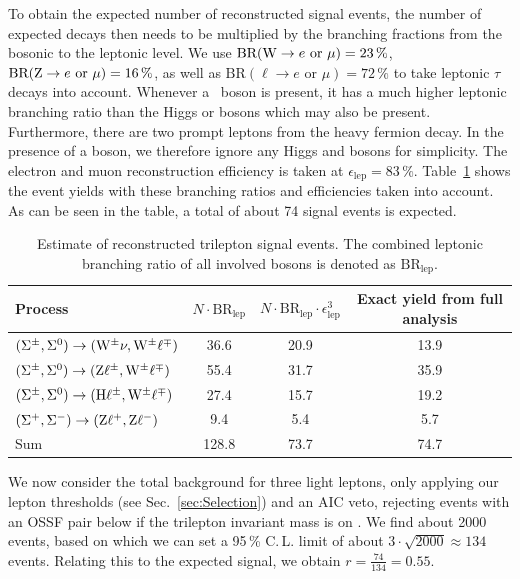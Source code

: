 To obtain the expected number of reconstructed signal events, the number of expected decays then needs to be multiplied by the branching fractions from the bosonic to the leptonic level. We use $\textrm{BR}(\mathrm{W} \to e \text{ or } \mu) = 23\,\%$, $\textrm{BR}(\mathrm{Z} \to e \text{ or } \mu) = 16\,\%$, as well as $\textrm{BR}(\ell\to e \text{ or } \mu) = 72\,\%$ to take leptonic $\tau$ decays into account. Whenever a \PW\ boson is present, it has a much higher leptonic branching ratio than the Higgs or \Z bosons which may also be present. Furthermore, there are two prompt leptons from the heavy fermion decay. In the presence of a \PW boson, we therefore ignore any Higgs and \Z bosons for simplicity. The electron and muon reconstruction efficiency is taken at $\epsilon_\textrm{lep} = 83\,\%$. Table~\ref{tab:BackOfEnvelope/2} shows the event yields with these branching ratios and efficiencies taken into account. As can be seen in the table, a total of about 74 signal events is expected. 

\begin{table}
\centering
\caption{Estimate of reconstructed trilepton signal events. The combined leptonic branching ratio of all involved bosons is denoted as $\textrm{BR}_\textrm{lep}$.} \label{tab:BackOfEnvelope/2}
\begin{tabular}{lccc}
\hline\hline
Process & $N \cdot \textrm{BR}_\textrm{lep}$ & $N \cdot \textrm{BR}_\textrm{lep} \cdot \epsilon_\textrm{lep}^3$ & Exact yield from full analysis \\
\hline
$(\Sigma^\pm, \Sigma^0) \to (\mathrm{W}^\pm \nu, \mathrm{W}^\pm \ell^\mp)$  & 36.6 & 20.9 & 13.9 \\ %
$(\Sigma^\pm, \Sigma^0) \to (\mathrm{Z} \ell^\pm, \mathrm{W}^\pm \ell^\mp)$  & 55.4 & 31.7 & 35.9 \\ %
$(\Sigma^\pm, \Sigma^0) \to (\mathrm{H} \ell^\pm, \mathrm{W}^\pm \ell^\mp)$ & 27.4 & 15.7 & 19.2 \\ %
$(\Sigma^+, \Sigma^-) \to (\mathrm{Z} \ell^+, \mathrm{Z} \ell^-)$             & 9.4  & 5.4  & 5.7  \\ %
\hline
Sum               & 128.8                & 73.7              & 74.7 \\
\end{tabular}
\end{table}

We now consider the total background for three light leptons, only applying our lepton \pt thresholds (see Sec.~\ref{sec:Selection}) and an AIC veto, rejecting events with an OSSF pair below \Z if the trilepton invariant mass is on \Z. We find about 2000 events, based on which we can set a 95\,\% C.\,L. limit of about $3 \cdot \sqrt{2000} \approx 134$ events. Relating this to the expected signal, we obtain $r = \frac{74}{134} = 0.55$.

